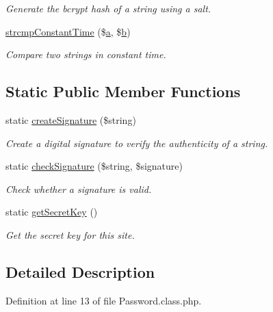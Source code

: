 \begin{DoxyCompactItemize}
\begin{DoxyCompactList}\small\item\em Generate the bcrypt hash of a string using a salt. \end{DoxyCompactList}\item 
\hyperlink{classPassword_a56edcc9dc50a2dc82886e943de17786b}{strcmp\+Constant\+Time} (\$\hyperlink{jqplot_8barRenderer_8min_8js_a15f14caa0c9de3a415d8eb9d88378fc0}{a}, \$\hyperlink{jqplot_8barRenderer_8min_8js_a2fc619a5cd76c0e5c2bd9f57a6fcbd3e}{b})
\begin{DoxyCompactList}\small\item\em Compare two strings in constant time. \end{DoxyCompactList}\end{DoxyCompactItemize}
\subsection*{Static Public Member Functions}
\begin{DoxyCompactItemize}
\item 
static \hyperlink{classPassword_ab68f934440f505f866bbeff9559fbefc}{create\+Signature} (\$string)
\begin{DoxyCompactList}\small\item\em Create a digital signature to verify the authenticity of a string. \end{DoxyCompactList}\item 
static \hyperlink{classPassword_a71ffb4de587c4d3db3cef10bcc8607e8}{check\+Signature} (\$string, \$signature)
\begin{DoxyCompactList}\small\item\em Check whether a signature is valid. \end{DoxyCompactList}\item 
static \hyperlink{classPassword_a34c9775ddb1701f8b136f872559c0fcc}{get\+Secret\+Key} ()
\begin{DoxyCompactList}\small\item\em Get the secret key for this site. \end{DoxyCompactList}\end{DoxyCompactItemize}


\subsection{Detailed Description}


Definition at line 13 of file Password.\+class.\+php.



